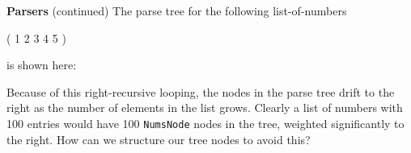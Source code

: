 \begin{minipage}[t]{\sw}
\slidenumber
\LARGE
{\bf Parsers} (continued)\exx
The parse tree for the following list-of-numbers
\begin{qv}
( 1 2 3 4 5 )
\end{qv}
is shown here:\exx
\centerline{}\exx
Because of this right-recursive looping,
the nodes in the parse tree drift to the right
as the number of elements in the list grows.
Clearly a list of numbers with 100 entries would have
100 \verb'NumsNode' nodes in the tree,
weighted significantly to the right.
How can we structure our tree nodes to avoid this?
\end{minipage}
\clearpage
